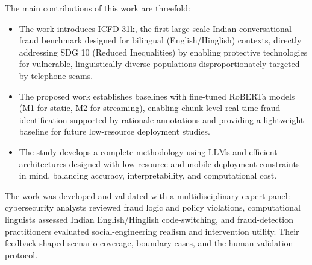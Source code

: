 \documentclass{article}
\newcommand{\crchange}[1]{{\color{blue}#1}}
\begin{document}
The main contributions of this work are threefold:
\begin{itemize}
    \item The work introduces ICFD-31k, the first large-scale Indian conversational fraud benchmark designed for bilingual (English/Hinglish) contexts, directly addressing SDG 10 (Reduced Inequalities) by enabling protective technologies for vulnerable, linguistically diverse populations disproportionately targeted by telephone scams.
    \item The proposed work establishes baselines with fine-tuned RoBERTa models (M1 for static, M2 for streaming), enabling chunk-level real-time fraud identification supported by rationale annotations and providing a lightweight baseline for future low-resource deployment studies.
    \item The study develops a complete methodology using LLMs and efficient architectures designed with low-resource and mobile deployment constraints in mind, balancing accuracy, interpretability, and computational cost.
\end{itemize}
\crchange{The work was developed and validated with a multidisciplinary expert panel: cybersecurity analysts reviewed fraud logic and policy violations, computational linguists assessed Indian English/Hinglish code-switching, and fraud-detection practitioners evaluated social-engineering realism and intervention utility. Their feedback shaped scenario coverage, boundary cases, and the human validation protocol.}
\end{document}

